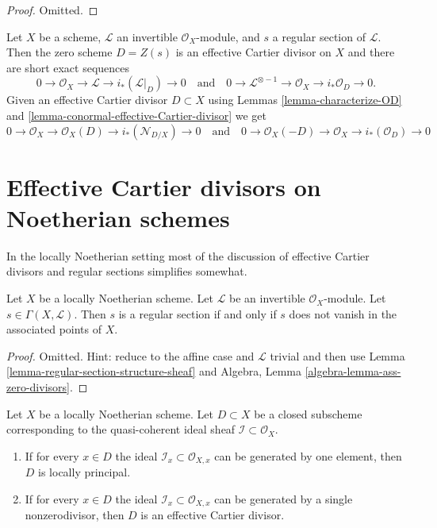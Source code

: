 \begin{proof}
Omitted.
\end{proof}

\begin{remark}
\label{remark-ses-regular-section}
Let $X$ be a scheme, $\mathcal{L}$ an invertible $\mathcal{O}_X$-module,
and $s$ a regular section of $\mathcal{L}$. Then the zero scheme
$D = Z(s)$ is an effective Cartier divisor on $X$ and there are
short exact sequences
$$
0 \to \mathcal{O}_X \to \mathcal{L} \to i_*(\mathcal{L}|_D) \to 0
\quad\text{and}\quad
0 \to \mathcal{L}^{\otimes -1} \to \mathcal{O}_X \to i_*\mathcal{O}_D \to 0.
$$
Given an effective Cartier divisor $D \subset X$ using
Lemmas \ref{lemma-characterize-OD} and
\ref{lemma-conormal-effective-Cartier-divisor}
we get
$$
0 \to \mathcal{O}_X \to \mathcal{O}_X(D) \to i_*(\mathcal{N}_{D/X}) \to 0
\quad\text{and}\quad
0 \to \mathcal{O}_X(-D) \to \mathcal{O}_X \to i_*(\mathcal{O}_D) \to 0
$$
\end{remark}






\section{Effective Cartier divisors on Noetherian schemes}
\label{section-Noetherian-effective-Cartier}

\noindent
In the locally Noetherian setting most of the discussion of
effective Cartier divisors and regular sections simplifies somewhat.

\begin{lemma}
\label{lemma-regular-section-associated-points}
Let $X$ be a locally Noetherian scheme. Let $\mathcal{L}$ be an invertible
$\mathcal{O}_X$-module. Let $s \in \Gamma(X, \mathcal{L})$. Then $s$
is a regular section if and only if $s$ does not vanish in the associated
points of $X$.
\end{lemma}

\begin{proof}
Omitted. Hint: reduce to the affine case and $\mathcal{L}$ trivial
and then use Lemma \ref{lemma-regular-section-structure-sheaf} and
Algebra, Lemma \ref{algebra-lemma-ass-zero-divisors}.
\end{proof}

\begin{lemma}
\label{lemma-effective-Cartier-in-points}
Let $X$ be a locally Noetherian scheme. Let $D \subset X$ be a closed subscheme
corresponding to the quasi-coherent ideal sheaf
$\mathcal{I} \subset \mathcal{O}_X$.
\begin{enumerate}
\item If for every $x \in D$ the ideal
$\mathcal{I}_x \subset \mathcal{O}_{X, x}$
can be generated by one element, then $D$ is locally principal.
\item If for every $x \in D$ the ideal
$\mathcal{I}_x \subset \mathcal{O}_{X, x}$
can be generated by a single nonzerodivisor, then $D$ is an
effective Cartier divisor.
\end{enumerate}
\end{lemma}

